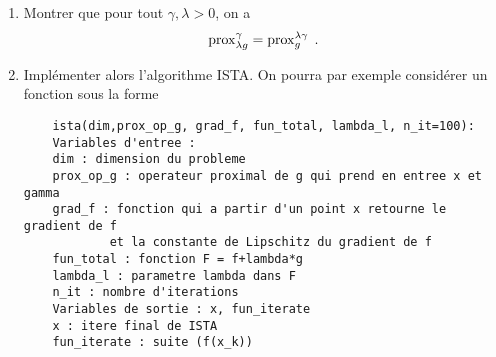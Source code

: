 \documentclass[a4paper,french,12pt]{article}
\begin{document}
\begin{enumerate}
\item Montrer que pour tout $\gamma, \lambda >0$, on a
  \begin{equation*}
    \operatorname{prox}_{\lambda g}^{\gamma} = \operatorname{prox}_{ g}^{\lambda \gamma} \;.
  \end{equation*}
\item Implémenter alors l'algorithme ISTA. On pourra par exemple considérer un fonction
  sous la forme
  \begin{lstlisting}
    ista(dim,prox_op_g, grad_f, fun_total, lambda_l, n_it=100):
    Variables d'entree :
    dim : dimension du probleme
    prox_op_g : operateur proximal de g qui prend en entree x et gamma
    grad_f : fonction qui a partir d'un point x retourne le gradient de f
            et la constante de Lipschitz du gradient de f
    fun_total : fonction F = f+lambda*g
    lambda_l : parametre lambda dans F
    n_it : nombre d'iterations
    Variables de sortie : x, fun_iterate
    x : itere final de ISTA
    fun_iterate : suite (f(x_k))
  \end{lstlisting}
\end{enumerate}
\end{document}
